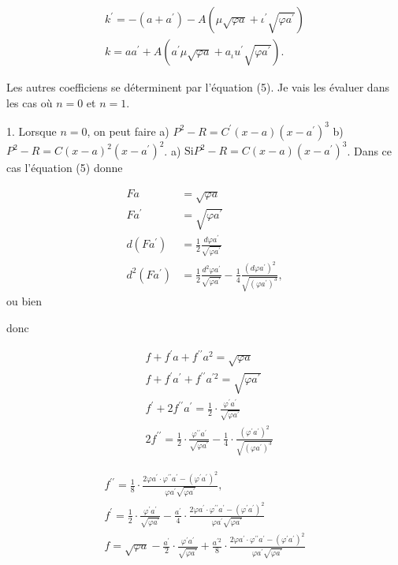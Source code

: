 \documentclass{article}
\begin{document}
\[
\begin{gathered}
k^{\prime}=-\left(a+a^{\prime}\right)-A\left(\mu \sqrt{\varphi a}+\iota^{\prime} \sqrt{\varphi a^{\prime}}\right) \\
k=a a^{\prime}+A\left(a^{\prime} \mu \sqrt{\varphi a}+a_{\iota} u^{\prime} \sqrt{\varphi a^{\prime}}\right) .
\end{gathered}
\]

Les autres coefficiens se déterminent par l'équation (5). Je vais les évaluer dans les cas où \(n=0\) et \(n=1\).

1. Lorsque \(n=0\), on peut faire
a) \(P^{2}-R=C^{\prime}(x-a)\left(x-a^{\prime}\right)^{3}\)
b) \(P^{2}-R=C(x-a)^{2}\left(x-a^{\prime}\right)^{2}\).
a) \(\mathrm{Si} P^{2}-R=C(x-a)\left(x-a^{\prime}\right)^{3}\). Dans ce cas l'équation (5) donne

\[
\begin{aligned}
F a & =\sqrt{\varphi a} \\
F a^{\prime} & =\sqrt{\varphi a^{\prime}} \\
d\left(F a^{\prime}\right) & =\frac{1}{2} \frac{d \varphi a^{\prime}}{\sqrt{\varphi a^{\prime}}} \\
d^{2}\left(F a^{\prime}\right) & =\frac{1}{2} \frac{d^{2} \varphi a^{\prime}}{\sqrt{\varphi a^{\prime}}}-\frac{1}{4} \frac{\left(d \varphi a^{\prime}\right)^{2}}{\sqrt{\left(\varphi a^{\prime}\right)^{3}}},
\end{aligned}
\]
ou bien

donc

\[
\begin{aligned}
& f+f^{\prime} a+f^{\prime \prime} a^{2}=\sqrt{\varphi a} \\
& f+f^{\prime} a^{\prime}+f^{\prime \prime} a^{\prime 2}=\sqrt{\varphi a^{\prime}} \\
& f^{\prime}+2 f^{\prime \prime} a^{\prime}=\frac{1}{2} \cdot \frac{\varphi^{\prime} a^{\prime}}{\sqrt{\varphi a^{\prime}}} \\
& 2 f^{\prime \prime}=\frac{1}{2} \cdot \frac{\varphi^{\prime \prime} a^{\prime}}{\sqrt{\varphi a^{\prime}}}-\frac{1}{4} \cdot \frac{\left(\varphi^{\prime} a^{\prime}\right)^{2}}{\sqrt{\left(\varphi a^{\prime}\right)^{3}}}
\end{aligned}
\]

\[
\begin{gathered}
f^{\prime \prime}=\frac{1}{8} \cdot \frac{2 \varphi a^{\prime} \cdot \varphi^{\prime \prime} a^{\prime}-\left(\varphi^{\prime} a^{\prime}\right)^{2}}{\varphi a^{\prime} \sqrt{\varphi a^{\prime}}}, \\
f^{\prime}=\frac{1}{2} \cdot \frac{\varphi^{\prime} a^{\prime}}{\sqrt{\varphi a^{\prime}}}-\frac{a^{\prime}}{4} \cdot \frac{2 \varphi a^{\prime} \cdot \varphi^{\prime \prime} a^{\prime}-\left(\varphi^{\prime} a^{\prime}\right)^{2}}{\varphi a^{\prime} \sqrt{\varphi a^{\prime}}} \\
f=\sqrt{\varphi a}-\frac{a^{\prime}}{2} \cdot \frac{\varphi^{\prime} a^{\prime}}{\sqrt{\varphi a^{\prime}}}+\frac{a^{\prime 2}}{8} \cdot \frac{2 \varphi a^{\prime} \cdot \varphi^{\prime \prime} a^{\prime}-\left(\varphi^{\prime} a^{\prime}\right)^{2}}{\varphi a^{\prime} \sqrt{\varphi a^{\prime}}}
\end{gathered}
\]
\end{document}
